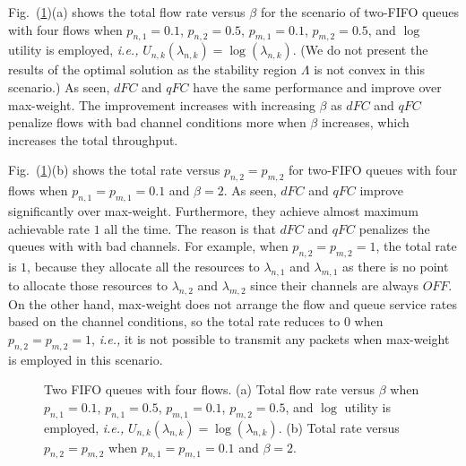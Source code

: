 \documentclass[conference]{IEEEtran}
\newcommand{\ie}{{\em i.e., }}
\begin{document}
Fig.~(\ref{fig:sim_3})(a) shows the total flow rate versus $\beta$ for the scenario of two-FIFO queues with four flows when $p_{n,1}=0.1$, $p_{n,2} = 0.5$, $p_{m,1} = 0.1$, $p_{m,2} = 0.5$, and $\log$ utility is employed, \ie $U_{n,k}(\lambda_{n,k}) = \log(\lambda_{n,k})$. (We do not present the results of the optimal solution as the stability region $\Lambda$ is not convex in this scenario.) As seen, $dFC$ and $qFC$ have the same performance and improve over max-weight. The improvement increases with increasing $\beta$ as $dFC$ and $qFC$ penalize flows with bad channel conditions more when $\beta$ increases, which increases the total throughput.   

Fig.~(\ref{fig:sim_3})(b) shows the total rate versus $p_{n,2}=p_{m,2}$ for two-FIFO queues with four flows when $p_{n,1}=p_{m,1}=0.1$ and $\beta=2$. As seen, $dFC$ and $qFC$ improve significantly over max-weight. Furthermore, they achieve almost maximum achievable rate $1$ all the time. The reason is that $dFC$ and $qFC$ penalizes the queues with with bad channels. For example, when $p_{n,2}=p_{m,2}=1$, the total rate is $1$, because they allocate all the resources to $\lambda_{n,1}$ and $\lambda_{m,1}$ as there is no point to allocate those resources to $\lambda_{n,2}$ and $\lambda_{m,2}$ since their channels are always $OFF$. On the other hand, max-weight does not arrange the flow and queue service rates based on the channel conditions, so the total rate reduces to $0$ when $p_{n,2}=p_{m,2}=1$, \ie it is not possible to transmit any packets when max-weight is employed in this scenario.



\begin{figure}
\centering
{}
\vspace{-10pt}
\caption{Two FIFO queues with four flows. (a) Total flow rate versus $\beta$ when $p_{n,1}=0.1$, $p_{n,1} = 0.5$, $p_{m,1} = 0.1$, $p_{m,2} = 0.5$, and $\log$ utility is employed, \ie $U_{n,k}(\lambda_{n,k}) = \log(\lambda_{n,k})$. (b) Total rate versus $p_{n,2}=p_{m,2}$ when $p_{n,1}=p_{m,1}=0.1$ and $\beta=2$. }
\label{fig:sim_3}
\vspace{-5pt}
\end{figure}
\end{document}
